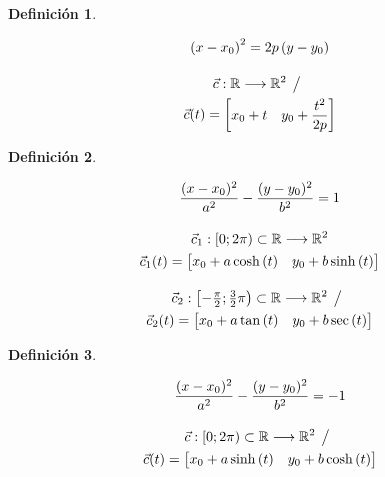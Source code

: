 \documentclass[a5paper,12pt,twoside]{book}
\newtheorem{defn}{{Definición}}[chapter]
\begin{document}
\begin{mdframed}[style=DefinitionFrame]
    \begin{defn}
    \end{defn}
    \begin{gather*}
        \left(x-x_0\right)^2=2p\left(y-y_0\right)
        \\[1em]
        \Vec{c}:\mathbb{R} \longrightarrow \mathbb{R}^2 \hspace{1ex} \big/ \hspace{1ex}
        \\
        \Vec{c}(t) = \begin{bmatrix} x_0 + t & y_0 + \dfrac{t^2}{2p} \end{bmatrix}
    \end{gather*}
\end{mdframed}

\begin{mdframed}[style=DefinitionFrame]
    \begin{defn}
    \end{defn}
    \begin{gather*}
        \dfrac{(x-x_0)^2}{a^2}-\dfrac{(y-y_0)^2}{b^2}=1
        \\[1em]
        \Vec{c}_1:[0;2 \pi) \subset \mathbb{R} \longrightarrow \mathbb{R}^2
        \\
        \Vec{c}_1(t) = \begin{bmatrix} x_0 + a\cosh{(t)} & y_0 + b\sinh{(t)} \end{bmatrix}
        \\[1em]
        \Vec{c}_2:\left[-\tfrac{\pi}{2}; \tfrac{3}{2} \pi\right) \subset \mathbb{R} \longrightarrow \mathbb{R}^2 \hspace{1ex} \big/ \hspace{1ex}
        \\
        \Vec{c}_2(t)= \begin{bmatrix} x_0 + a\tan{(t)} & y_0 + b\sec{(t)} \end{bmatrix}
    \end{gather*}
\end{mdframed}

\begin{mdframed}[style=DefinitionFrame]
    \begin{defn}
    \end{defn}
    \begin{gather*}
        \dfrac{(x-x_0)^2}{a^2}-\dfrac{(y-y_0)^2}{b^2}=-1
        \\[1em]
        \Vec{c}:[0;2 \pi) \subset \mathbb{R} \longrightarrow \mathbb{R}^2 \hspace{1ex} \big/ \hspace{1ex}
        \\
        \Vec{c}(t)= \begin{bmatrix} x_0 + a\sinh{(t)} & y_0 + b\cosh{(t)} \end{bmatrix}
    \end{gather*}
\end{mdframed}
\end{document}
